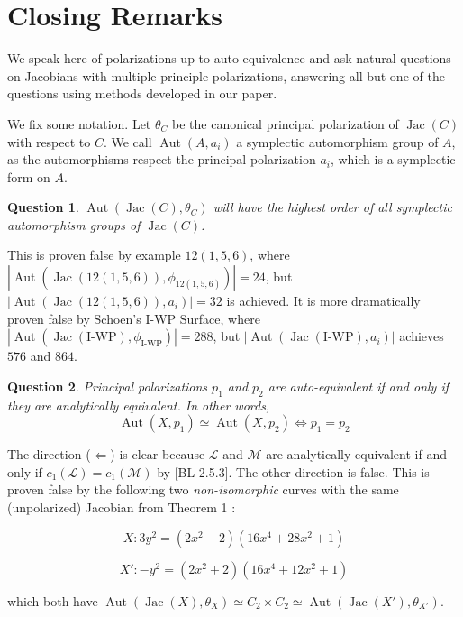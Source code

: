 \documentclass[12pt,reqno]{amsart}
\DeclareMathOperator{\Aut}{Aut}
\DeclareMathOperator{\Jac}{Jac}
\newcommand{\Z}{\mathbb{Z}}
\newcommand{\mc}{\mathcal}
\newtheorem*{question}{Question}
\theoremstyle{definition}
\theoremstyle{remark}
\begin{document}
\section{Closing Remarks}
\label{sec:questions}

We speak here of polarizations up to auto-equivalence and ask natural questions on Jacobians with multiple principle polarizations, answering all but one of the questions using methods developed in our paper.

We fix some notation. Let $\theta_C$ be the canonical principal polarization of $\Jac(C)$ with respect to $C$. We call $\Aut(A, a_i)$ a symplectic automorphism group of $A$, as the automorphisms respect the principal polarization $a_i$, which is a symplectic form on $A$.

\begin{question} $\Aut(\Jac(C), \theta_C)$ will have the highest order of all symplectic automorphism groups of $\Jac(C)$. \end{question}

This is proven false by example $12(1,5,6)$, where $|\Aut(\Jac(12(1, 5, 6)), \phi_{12(1, 5, 6)})| = 24$, but $|\Aut(\Jac(12(1, 5, 6)), a_i)| = 32$ is achieved. It is more dramatically proven false by Schoen's I-WP Surface, where $|\Aut(\Jac(\text{I-WP}), \phi_{\text{I-WP}})| = 288$, but $|\Aut(\Jac(\text{I-WP}), a_i)|$ achieves $576$ and $864$.

\begin{question} Principal polarizations $p_1$ and $p_2$ are auto-equivalent if and only if they are analytically equivalent. In other words, $$\Aut(X, p_1) \simeq \Aut(X, p_2) \Leftrightarrow p_1 = p_2$$ \end{question}

The direction ($\Leftarrow$) is clear because $\mc{L}$ and $\mc{M}$ are analytically equivalent if and only if $c_1(\mc{L}) = c_1(\mc{M})$ by [BL 2.5.3]. The other direction is false.  This is proven false by the following two \textit{non-isomorphic} curves with the same (unpolarized) Jacobian from Theorem 1  \cite{howe1}:

$$X: 3y^2 = (2x^2- 2)(16x^4 + 28x^2 + 1)$$ 

$$X': -y^2 = (2x^2 + 2)(16x^4 + 12x^2 + 1)$$ 

which both have $\Aut(\Jac(X), \theta_X)\simeq C_2 \times C_2 \simeq \Aut(\Jac(X'), \theta_{X'})$. %

\end{document}
